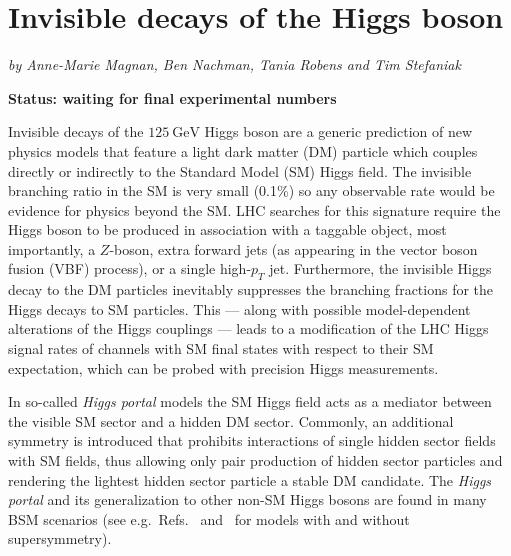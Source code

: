 \documentclass[../report.tex]{subfiles}
\begin{document}
\section{Invisible decays of the Higgs boson}

\begin{center}
\textit{by Anne-Marie Magnan, Ben Nachman, Tania Robens and Tim Stefaniak}
\end{center}

{\bf{Status: waiting for final experimental numbers}}

Invisible decays of the $125~\mathrm{GeV}$ Higgs boson are a generic prediction of new physics models that feature a light dark matter (DM) particle which couples directly or indirectly to the Standard Model (SM) Higgs field. The invisible branching ratio in the SM is very small (0.1\%) so any observable rate would be evidence for physics beyond the SM.  LHC searches for this signature require the Higgs boson to be produced in association with a taggable object, most importantly, a $Z$-boson, extra forward jets (as appearing in the vector boson fusion (VBF) process), or a single high-$p_T$ jet. Furthermore, the invisible Higgs decay to the DM particles inevitably suppresses the branching fractions for the Higgs decays to SM particles. This --- along with possible model-dependent alterations of the Higgs couplings --- leads to a modification of the LHC Higgs signal rates of channels with SM final states with respect to their SM expectation, which can be probed with precision Higgs measurements. 

In so-called \emph{Higgs portal} models the SM Higgs field acts as a mediator between the visible SM sector and a hidden DM sector. {Commonly,} an additional symmetry {is introduced that} prohibits interactions of single hidden sector fields with SM fields, thus allowing only pair production of hidden sector particles and rendering the lightest hidden sector particle a stable DM candidate. 
The \emph{Higgs portal} and its generalization to other non-SM Higgs bosons are found in many BSM scenarios (see e.g.~Refs.~\cite{McDonald:2008up,McDonald:2008ua,ArkaniHamed:2006mb,Profumo:2017ntc} and~\cite{Barger:2008jx,Cohen:2011ec,Englert:2011yb,Goudelis:2013uca,Bai:2012nv,Berlin:2015wwa} for models with and without supersymmetry). 
\end{document}
